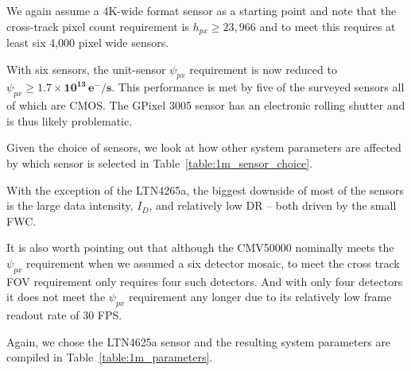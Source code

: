 \documentclass[]{spieman}  %
\begin{document}
We again assume a 4K-wide format sensor as a starting point and note that the cross-track pixel count requirement is $h_{px} \geq 23,966$ and to meet this requires at least six 4,000 pixel wide sensors.

With six sensors, the unit-sensor $\psi_{px}$ requirement is now reduced to $\psi_{px} \geq \mathbf{1.7 \times 10^{13} \, e^-/s}$. This performance is met by five of the surveyed sensors all of which are CMOS.  The GPixel 3005 sensor has an electronic rolling shutter and is thus likely problematic.

Given the choice of sensors, we look at how other system parameters are affected by which sensor is selected in Table~\ref{table:1m_sensor_choice}.

\begin{table}[h!]
\centering
{}
\caption{Impact of sensor choice on other system parameters}
\label{table:1m_sensor_choice}
\end{table}

With the exception of the LTN4265a, the biggest downside of most of the sensors is the large data intensity, $I_D$, and relatively low DR -- both driven by the small FWC.

It is also worth pointing out that although the CMV50000 nominally meets the $\psi_{px}$ requirement when we assumed a six detector mosaic, to meet the cross track FOV requirement only requires four such detectors.  And with only four detectors it does not meet the $\psi_{px}$ requirement any longer due to its relatively low frame readout rate of 30 FPS.

Again, we chose the LTN4625a sensor and the resulting system parameters are compiled in Table~\ref{table:1m_parameters}.
\end{document}

